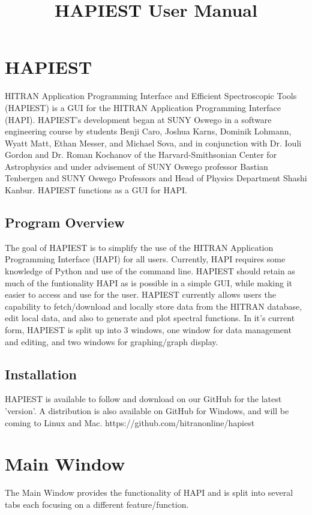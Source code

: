 \documentclass[12pt]{article}
\begin{document}
\title{HAPIEST User Manual} 
\date{}
\maketitle
\thispagestyle{empty}
\newpage
\tableofcontents
\thispagestyle{empty}
\newpage
\setcounter{page}{1}

\section{HAPIEST}
HITRAN Application Programming Interface and Efficient Spectroscopic Tools (HAPIEST) is a GUI for the HITRAN Application Programming Interface (HAPI). HAPIEST's development began at SUNY Oswego in a software engineering course by students Benji Caro, Joshua Karns, Dominik Lohmann, Wyatt Matt, Ethan Messer, and Michael Sova, and in conjunction with Dr. Iouli Gordon and Dr. Roman Kochanov of the Harvard-Smithsonian Center for Astrophysics and under advisement of SUNY Oswego professor Bastian Tenbergen and SUNY Oswego Professors and Head of Physics Department Shashi Kanbur. HAPIEST functions as a GUI for HAPI.

\subsection{Program Overview}
The goal of HAPIEST is to simplify the use of the HITRAN Application Programming Interface (HAPI) for all users. Currently, HAPI requires some knowledge of Python and use of the command line. HAPIEST should retain as much of the funtionality HAPI as is possible in a simple GUI, while making it easier to access and use for the user. HAPIEST currently allows users the capability to fetch/download and locally store data from the HITRAN database, edit local data, and also to generate and plot spectral functions. In it's current form, HAPIEST is split up into 3 windows, one window for data management and editing, and two windows for graphing/graph display.

\subsection{Installation}
HAPIEST is available to follow and download on our GitHub for the latest 'version'. A distribution is also available on GitHub for Windows, and will be coming to Linux and Mac.
https://github.com/hitranonline/hapiest

\section{Main Window}
The Main Window provides the functionality of HAPI and is split into several tabs each focusing on a different feature/function. 
\end{document}
